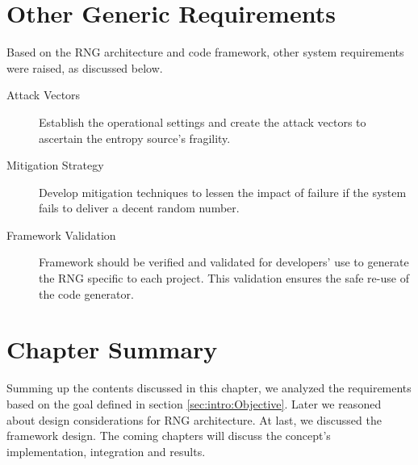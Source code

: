 %
%
\section{Other Generic Requirements}
\label{sec:CD:OGR}
Based on the RNG architecture and code framework, other system requirements were raised, as discussed below. 
\begin{description}
	\item[Attack Vectors] Establish the operational settings and create the attack vectors to ascertain the entropy source’s fragility.
	
	\item[Mitigation Strategy] Develop mitigation techniques to lessen the impact of failure if the system fails to deliver a decent random number.
	
	\item[Framework Validation] Framework should be verified and validated for developers' use to generate the RNG specific to each project. This validation ensures the safe re-use of the code generator.
\end{description}


%
%
\section{Chapter Summary}
\label{sec:CD:Summary}
Summing up the contents discussed in this chapter, we analyzed the requirements based on the goal defined in section \ref{sec:intro:Objective}. Later we reasoned about design considerations for RNG architecture. At last, we discussed the framework design. The coming chapters will discuss the concept’s implementation, integration and results.